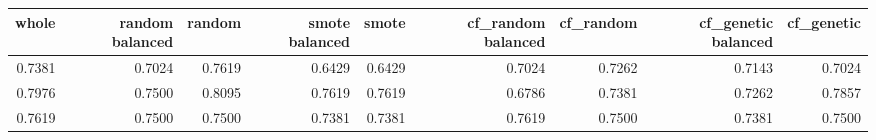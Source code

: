 \begin{tabular}{rrrrrrrrr}
\toprule

 whole &  random balanced &  random &  smote balanced &  smote &  cf\_random balanced &  cf\_random &  cf\_genetic balanced &  cf\_genetic \\
\midrule

0.7381 &           0.7024 &  0.7619 &          0.6429 & 0.6429 &              0.7024 &     0.7262 &               0.7143 &      0.7024 \\
0.7976 &           0.7500 &  0.8095 &          0.7619 & 0.7619 &              0.6786 &     0.7381 &               0.7262 &      0.7857 \\
0.7619 &           0.7500 &  0.7500 &          0.7381 & 0.7381 &              0.7619 &     0.7500 &               0.7381 &      0.7500 \\

\bottomrule
\end{tabular}

